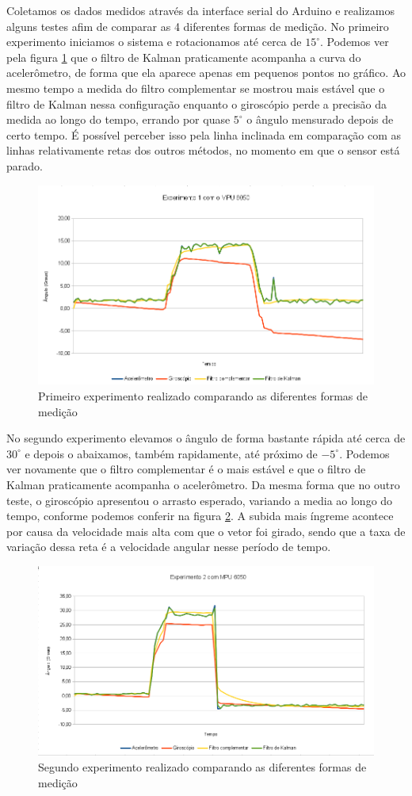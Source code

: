 \documentclass[a4paper,12pt]{article}
\begin{document}
Coletamos os dados medidos através da interface serial do Arduino e realizamos alguns testes afim de comparar as 4 diferentes formas de medição. No primeiro experimento iniciamos o sistema e rotacionamos até cerca de $15^\circ$. Podemos ver pela figura \ref{exp1} que o filtro de Kalman praticamente acompanha a curva do acelerômetro, de forma que ela aparece apenas em pequenos pontos no gráfico. Ao mesmo tempo a medida do filtro complementar se mostrou mais estável que o filtro de Kalman nessa configuração enquanto o giroscópio perde a precisão da medida ao longo do tempo, errando por quase $5^\circ$ o ângulo mensurado depois de certo tempo. É possível perceber isso pela linha inclinada em comparação com as linhas relativamente retas dos outros métodos, no momento em que o sensor está parado.

\begin{figure}[H]
\centering
\includegraphics[width=.8\textwidth]{img/exp1.png}
\caption{Primeiro experimento realizado comparando as diferentes formas de medição}
\label{exp1}
\end{figure}

No segundo experimento elevamos o ângulo de forma bastante rápida até cerca de $30^\circ$ e depois o abaixamos, também rapidamente, até próximo de $-5^\circ$. Podemos ver novamente que o filtro complementar é o mais estável e que o filtro de Kalman praticamente acompanha o acelerômetro. Da mesma forma que no outro teste, o giroscópio apresentou o arrasto esperado, variando a media ao longo do tempo, conforme podemos conferir na figura \ref{exp2}. A subida mais íngreme acontece por causa da velocidade mais alta com que o vetor foi girado, sendo que a taxa de variação dessa reta é a velocidade angular nesse período de tempo.

\begin{figure}[H]
\centering
\includegraphics[width=.8\textwidth]{img/exp2.png}
\caption{Segundo experimento realizado comparando as diferentes formas de medição}
\label{exp2}
\end{figure}
\end{document}

